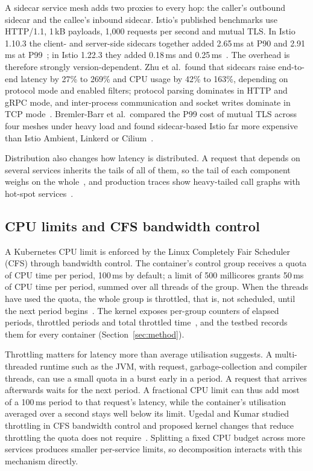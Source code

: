 A sidecar service mesh adds two proxies to every hop: the caller's outbound sidecar and the
callee's inbound sidecar. Istio's published benchmarks use HTTP/1.1, 1\,kB payloads,
1{,}000 requests per second and mutual TLS. In Istio 1.10.3 the client- and server-side sidecars together added
2.65\,ms at P90 and 2.91\,ms at P99~\cite{Istio110Perf}; in Istio 1.22.3 they added 0.18\,ms and
0.25\,ms~\cite{Istio122Perf}. The overhead is therefore strongly
version-dependent. Zhu et al.\ found that sidecars raise end-to-end latency by 27\% to 269\% and
CPU usage by 42\% to 163\%, depending on protocol mode and enabled filters; protocol parsing
dominates in HTTP and gRPC mode, and inter-process communication and socket writes dominate in TCP
mode~\cite{Zhu2023}. Bremler-Barr et al.\ compared the P99 cost of mutual TLS across four meshes under heavy load and found
sidecar-based Istio far more expensive than Istio Ambient, Linkerd or Cilium~\cite{BremlerBarr2025}.

Distribution also changes how latency is distributed. A request that depends on several services
inherits the tails of all of them, so the tail of each component weighs on the whole~\cite{Dean2013}, and
production traces show heavy-tailed call graphs with hot-spot services~\cite{Luo2021}.

\subsection{CPU limits and CFS bandwidth control}
\label{sec:bg-cfs}

A Kubernetes CPU limit is enforced by the Linux Completely Fair Scheduler (CFS) through bandwidth
control. The container's control group receives a quota of CPU time per period, 100\,ms by
default; a limit of 500 millicores grants 50\,ms of CPU time per period, summed over all threads of
the group. When the threads have used the quota, the whole group is throttled, that is, not
scheduled, until the next period begins~\cite{KernelBWC}. The kernel exposes per-group counters of
elapsed periods, throttled periods and total throttled time~\cite{KernelBWC}, and the testbed
records them for every container (Section~\ref{sec:method}).

Throttling matters for latency more than average utilisation suggests. A multi-threaded runtime
such as the JVM, with request, garbage-collection and compiler threads, can use a small quota in a
burst early in a period. A request that arrives afterwards waits for the next period. A
fractional CPU limit can thus add most of a 100\,ms period to that request's latency, while the container's
utilisation averaged over a second stays well below its limit. Ugedal and Kumar studied
throttling in CFS bandwidth control and proposed kernel changes that reduce throttling the quota
does not require~\cite{Ugedal2022}. Splitting a fixed CPU budget across more services produces
smaller per-service limits, so decomposition interacts with this mechanism directly.


